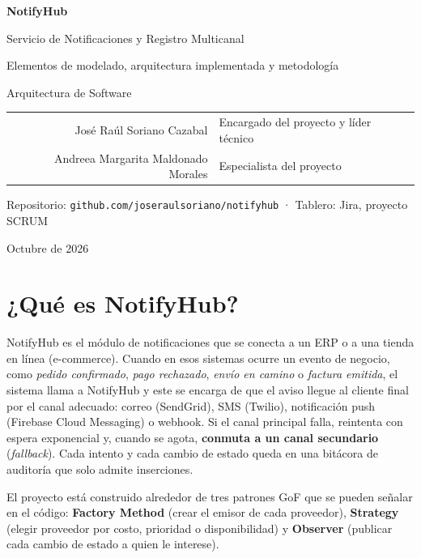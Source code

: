 \documentclass[11pt,a4paper]{article}
\begin{document}
\begin{titlepage}
  \centering
  \vspace*{3cm}
  {\Huge\bfseries\color{indigo} NotifyHub\par}
  \vspace{0.4cm}
  {\Large Servicio de Notificaciones y Registro Multicanal\par}
  \vspace{1.2cm}
  {\large Elementos de modelado, arquitectura implementada y metodología\par}
  \vspace{2.5cm}
  {\large Arquitectura de Software\par}
  \vspace{1.5cm}
  \begin{tabular}{rl}
    José Raúl Soriano Cazabal & Encargado del proyecto y líder técnico \\
    Andreea Margarita Maldonado Morales & Especialista del proyecto \\
  \end{tabular}
  \vfill
  {\small Repositorio: \texttt{github.com/joseraulsoriano/notifyhub} · Tablero: Jira, proyecto SCRUM\par}
  {\small Octubre de 2026\par}
\end{titlepage}

\tableofcontents
\newpage

\section{¿Qué es NotifyHub?}

NotifyHub es el módulo de notificaciones que se conecta a un ERP o a una tienda en línea (e-commerce). Cuando en
esos sistemas ocurre un evento de negocio, como \emph{pedido confirmado}, \emph{pago rechazado}, \emph{envío en
camino} o \emph{factura emitida}, el sistema llama a NotifyHub y este se encarga de que el aviso llegue al cliente
final por el canal adecuado: correo (SendGrid), SMS (Twilio), notificación push (Firebase Cloud Messaging) o
webhook. Si el canal principal falla, reintenta con espera
exponencial y, cuando se agota, \textbf{conmuta a un canal secundario} (\emph{fallback}). Cada intento y cada cambio
de estado queda en una bitácora de auditoría que solo admite inserciones.

El proyecto está construido alrededor de tres patrones GoF que se pueden señalar en el código:
\textbf{Factory Method} (crear el emisor de cada proveedor), \textbf{Strategy} (elegir proveedor por costo, prioridad
o disponibilidad) y \textbf{Observer} (publicar cada cambio de estado a quien le interese).
\end{document}
